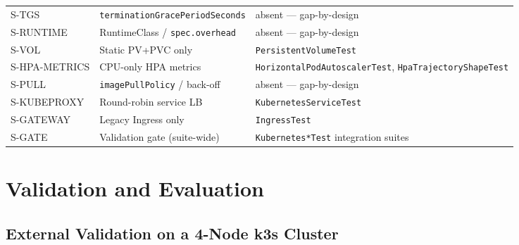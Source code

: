 \documentclass[ASNA,twocolumn]{USG}
\begin{document}
\begin{table}[!t]
\begin{tabular*}{\textwidth}{@{\extracolsep{\fill}}lll@{}}
S-TGS           & \texttt{terminationGracePeriodSeconds}& absent --- gap-by-design \\
S-RUNTIME       & RuntimeClass / \texttt{spec.overhead} & absent --- gap-by-design \\
S-VOL           & Static PV+PVC only                    & \texttt{PersistentVolumeTest} \\
S-HPA-METRICS   & CPU-only HPA metrics                  & \texttt{HorizontalPodAutoscalerTest}, \texttt{HpaTrajectoryShapeTest} \\
S-PULL          & \texttt{imagePullPolicy} / back-off   & absent --- gap-by-design \\
S-KUBEPROXY     & Round-robin service LB                & \texttt{KubernetesServiceTest} \\
S-GATEWAY       & Legacy Ingress only                   & \texttt{IngressTest} \\
S-GATE          & Validation gate (suite-wide)          & \texttt{Kubernetes*Test} integration suites \\
\bottomrule
        \end{tabular*}
    \end{table}

    \section{Validation and Evaluation}\label{sec:validation}

    \subsection{External Validation on a 4-Node k3s Cluster}\label{sec:external-validation}
\end{document}
